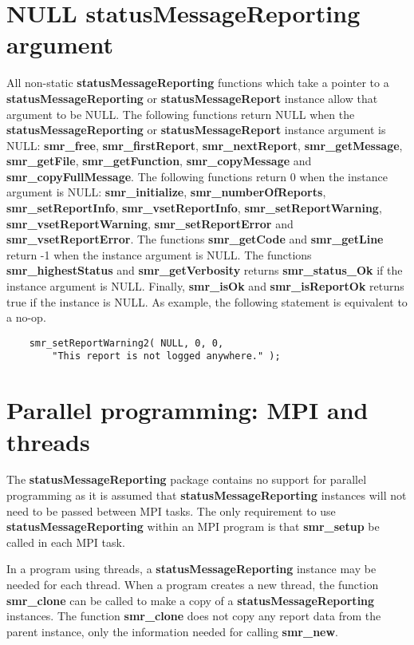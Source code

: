 \documentclass[11pt]{article}
\begin{document}
\section{NULL statusMessageReporting argument}
All non-static \textbf{statusMessageReporting} functions which take a pointer to a \textbf{statusMessage\-Reporting} or 
\textbf{statusMessageReport} instance allow that argument to be NULL.
The following functions return NULL when the \textbf{statusMessageReporting} or 
\textbf{statusMessageReport} instance argument is NULL: 
\textbf{smr\_free}, \textbf{smr\_firstReport}, \textbf{smr\_nextReport}, \textbf{smr\_getMessage}, \textbf{smr\_getFile}, 
\textbf{smr\_getFunction}, \textbf{smr\_\-copyMessage} and \textbf{smr\_\-copyFullMessage}.
The following functions return 0 when the instance argument is NULL: 
\textbf{smr\_\-initialize}, \textbf{smr\_numberOf\-Reports}, \textbf{smr\_set\-Report\-Info}, 
\textbf{smr\_vsetReport\-Info}, \textbf{smr\_setReport\-Warning}, 
\textbf{smr\_vset\-Report\-Warning}, \textbf{smr\_set\-Report\-Error} and \textbf{smr\_vsetReport\-Error}.
The functions \textbf{smr\_get\-Code} and \textbf{smr\_get\-Line} return -1 when the instance argument is NULL.
The functions \textbf{smr\-\_\-highest\-Status} and \textbf{smr\_\-get\-Verbosity} 
returns \textbf{smr\_status\_Ok} if the instance argument is NULL. 
Finally, \textbf{smr\_isOk} and \textbf{smr\_isReportOk} returns true if the instance is NULL.
As example, the following statement is equivalent to a no-op.
\begin{verbatim}
    smr_setReportWarning2( NULL, 0, 0, 
        "This report is not logged anywhere." );
\end{verbatim}

\section{Parallel programming: MPI and threads}
The \textbf{statusMessageReporting} package contains no support for parallel programming as it is assumed that 
\textbf{statusMessageReporting} instances
will not need to be passed between MPI tasks. The only requirement to use \textbf{statusMessageReporting} within an MPI
program is that \textbf{smr\_setup} be called in each MPI task.

In a program using threads, a \textbf{statusMessageReporting} instance may be needed for each thread. When a program creates a new thread, the 
function \textbf{smr\_clone} can be called to make a copy of a \textbf{statusMessageReporting} instances. The function 
\textbf{smr\_clone} does not copy any report data from the parent instance, only the information needed for calling \textbf{smr\_new}.
\end{document}
